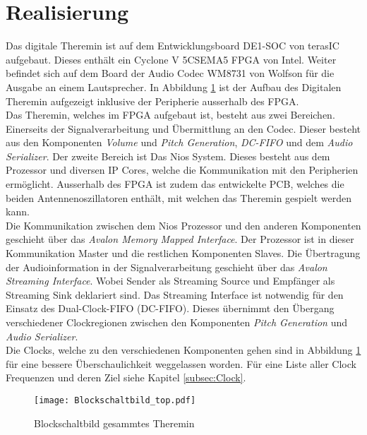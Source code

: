 \clearpage
\section{Realisierung}\label{sec:Realisierung}

Das digitale Theremin ist auf dem Entwicklungsboard DE1-SOC von terasIC aufgebaut. Dieses enthält ein Cyclone V 5CSEMA5 FPGA von Intel. Weiter befindet sich auf dem Board der Audio Codec WM8731 von Wolfson für die Ausgabe an einem Lautsprecher. In Abbildung \ref{img:Blockschaltbild_top} ist der Aufbau des Digitalen Theremin aufgezeigt inklusive der Peripherie ausserhalb des FPGA.\\
Das Theremin, welches im FPGA aufgebaut ist, besteht aus zwei Bereichen. Einerseits der Signalverarbeitung und Übermittlung an den Codec. Dieser besteht aus den Komponenten \textit{Volume} und \textit{Pitch Generation}, \textit{DC-FIFO} und dem \textit{Audio Serializer}. Der zweite Bereich ist Das Nios System. Dieses besteht aus dem Prozessor und diversen IP Cores, welche die Kommunikation mit den Peripherien ermöglicht. Ausserhalb des FPGA ist zudem das entwickelte PCB, welches die beiden Antennenoszillatoren enthält, mit welchen das Theremin gespielt werden kann.\\
Die Kommunikation zwischen dem Nios Prozessor und den anderen Komponenten geschieht über das \textit{Avalon Memory Mapped Interface}. Der Prozessor ist in dieser Kommunikation Master und die restlichen Komponenten Slaves. Die Übertragung der Audioinformation in der Signalverarbeitung geschieht über das \textit{Avalon Streaming Interface}. Wobei Sender als Streaming Source und Empfänger als Streaming Sink deklariert sind. Das Streaming Interface ist notwendig für den Einsatz des Dual-Clock-FIFO (DC-FIFO). Dieses übernimmt den Übergang verschiedener Clockregionen zwischen den Komponenten \textit{Pitch Generation} und \textit{Audio Serializer}.\\
Die Clocks, welche zu den verschiedenen Komponenten gehen sind in Abbildung \ref{img:Blockschaltbild_top} für eine bessere Überschaulichkeit weggelassen worden. Für eine Liste aller Clock Frequenzen und deren Ziel siehe Kapitel \ref{subsec:Clock}.

\begin{figure}[h!]
	\centering
	\texttt{[image: Blockschaltbild\_top.pdf]}
	\caption{Blockschaltbild gesammtes Theremin} 
	\label{img:Blockschaltbild_top}
\end{figure}  


